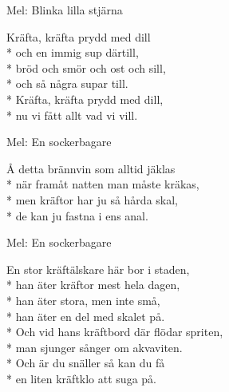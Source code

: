 \pagestyle{Kräftskivan}
\begin{SongText}
    \begin{SongInfo}
        Mel: Blinka lilla stjärna
    \end{SongInfo}
    \begin{SongVerse}
        Kräfta, kräfta prydd med dill\\*%
        och en immig sup därtill,\\*%
        bröd och smör och ost och sill,\\*%
        och så några supar till.\\*%
        Kräfta, kräfta prydd med dill,\\*%
        nu vi fått allt vad vi vill.
    \end{SongVerse}
\end{SongText}
\begin{SongText}[Kräftvisa]
    \begin{SongInfo}
        Mel: En sockerbagare
    \end{SongInfo}
    \begin{SongVerse}
        Å detta brännvin som alltid jäklas\\*%
        när framåt natten man måste kräkas,\\*%
        men kräftor har ju så hårda skal,\\*%
        de kan ju fastna i ens anal.
    \end{SongVerse}
\end{SongText}
\begin{SongText}[Kräftälskaren]
    \begin{SongInfo}
        Mel: En sockerbagare
    \end{SongInfo}
    \begin{SongVerse}
        En stor kräftälskare här bor i staden,\\*%
        han äter kräftor mest hela dagen,\\*%
        han äter stora, men inte små,\\*%
        han äter en del med skalet på.\\*%
        Och vid hans kräftbord där flödar spriten,\\*%
        man sjunger sånger om akvaviten.\\*%
        Och är du snäller så kan du få\\*%
        en liten kräftklo att suga på.
    \end{SongVerse}
\end{SongText}
